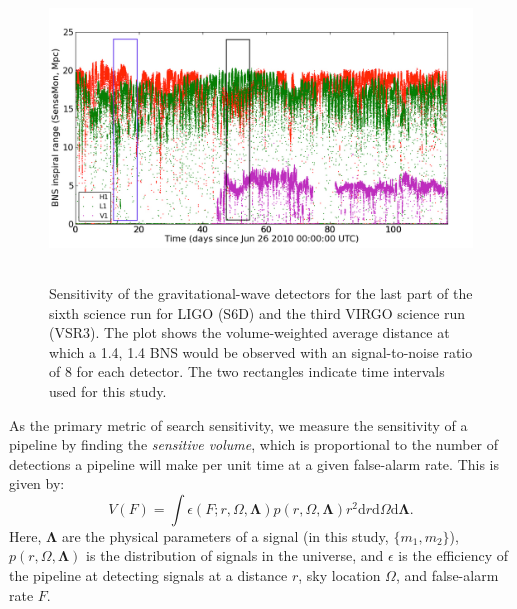 \documentclass[12pt]{iopart} \usepackage{graphicx,amssymb}
\begin{document}
\begin{figure}[tbp]
\begin{center}
\includegraphics[height=8cm]{figures/s6d-inspiral_range-intervall.png}  %
\caption{Sensitivity of the gravitational-wave detectors 
for the last part of the sixth science run for LIGO (S6D) and the third VIRGO science run (VSR3). 
The plot shows the volume-weighted average distance at which a 1.4, 1.4 BNS would be
observed with an signal-to-noise ratio of 8 for each detector. %
The two rectangles indicate time intervals used for this study. 
}
\label{img:inspiral-horizon}
\end{center}
\end{figure}

As the primary metric of search sensitivity, we measure the sensitivity of a 
pipeline by finding the \emph{sensitive
volume}, which is proportional to the number of detections a pipeline will
make per unit time at a given false-alarm rate. This is given by:
\begin{equation}
V(F) = \int \epsilon(F; r, \Omega, \mathbf{\Lambda}) p(r, \Omega, \mathbf{\Lambda}) r^2 \mathrm{d}r \mathrm{d}\Omega \mathrm{d}\mathbf{\Lambda}.
\end{equation}
Here, $\mathbf{\Lambda}$ are the physical parameters of a signal (in this
study, $\{m_1, m_2\}$), $p(r, \Omega, \mathbf{\Lambda})$ is the distribution of
signals in the universe, and $\epsilon$ is the efficiency of the pipeline at
detecting signals at a distance $r$, sky location $\Omega$, and false-alarm
rate $F$.
\end{document}
